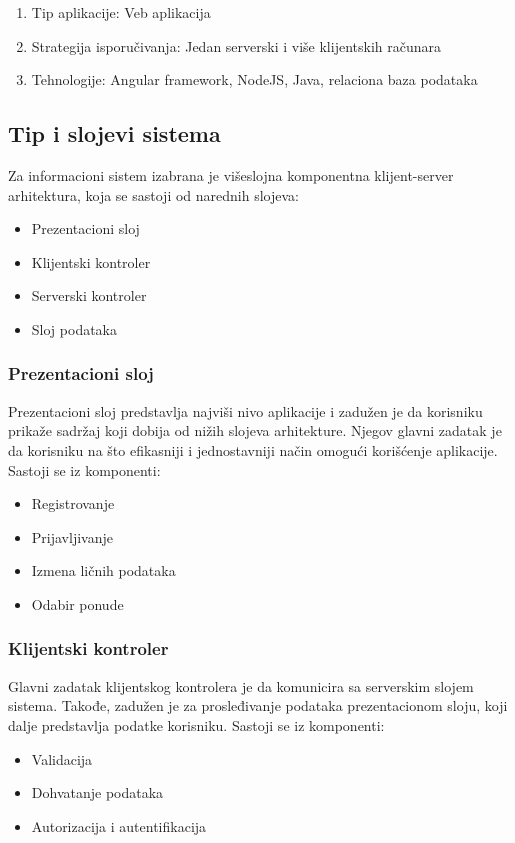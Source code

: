 \documentclass[a4paper]{article}
\begin{document}
\begin{enumerate}
    \item Tip aplikacije: Veb aplikacija
    \item Strategija isporučivanja: Jedan serverski i više klijentskih računara
    \item Tehnologije: Angular framework, NodeJS, Java, relaciona baza podataka
\end{enumerate}

\subsection{Tip i slojevi sistema}

Za informacioni sistem izabrana je višeslojna komponentna klijent-server arhitektura, koja se sastoji od narednih slojeva:

\begin{itemize}
    \item Prezentacioni sloj
    \item Klijentski kontroler
    \item Serverski kontroler
    \item Sloj podataka
\end{itemize}


\subsubsection{Prezentacioni sloj}

Prezentacioni sloj predstavlja najviši nivo aplikacije i zadužen je da korisniku prikaže sadržaj koji dobija od nižih slojeva arhitekture. Njegov glavni zadatak je da korisniku na što efikasniji i jednostavniji način omogući korišćenje aplikacije.
\newline
Sastoji se iz komponenti:
\begin{itemize}

\item Registrovanje
\item Prijavljivanje
\item Izmena ličnih podataka
\item Odabir ponude

\end{itemize}
\subsubsection{Klijentski kontroler}

Glavni zadatak klijentskog kontrolera je da komunicira sa serverskim slojem sistema. Takođe, zadužen je za prosleđivanje podataka prezentacionom sloju, koji dalje predstavlja podatke korisniku.
\newline
Sastoji se iz komponenti:
\begin{itemize}
\item Validacija
\item Dohvatanje podataka
\item Autorizacija i autentifikacija
\end{itemize}
\end{document}
